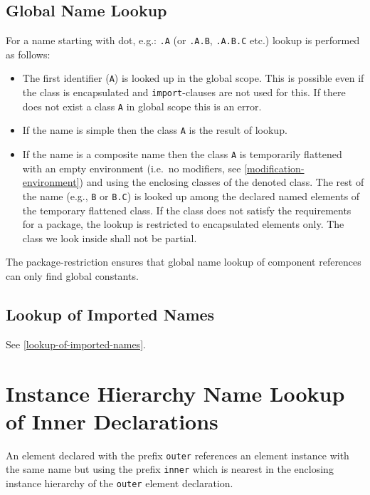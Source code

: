 \subsection{Global Name Lookup}\label{global-name-lookup}

For a name starting with dot, e.g.: \lstinline!.A! (or \lstinline!.A.B!, \lstinline!.A.B.C! etc.) lookup is performed as follows:
\begin{itemize}
\item
  The first identifier (\lstinline!A!) is looked up in the global scope.
  This is possible even if the class is encapsulated and \lstinline!import!-clauses are not used for this.
  If there does not exist a class \lstinline!A! in global scope this is an error.
\item
  If the name is simple then the class \lstinline!A! is the result of lookup.
\item
  If the name is a composite name then the class \lstinline!A! is temporarily flattened with an empty environment (i.e.\ no modifiers, see \cref{modification-environment}) and using the enclosing classes of the denoted class.
  The rest of the name (e.g., \lstinline!B! or \lstinline!B.C!) is looked up among the declared named elements of the temporary flattened class.
  If the class does not satisfy the requirements for a package, the lookup is restricted to encapsulated elements only.
  The class we look inside shall not be partial.
\end{itemize}

\begin{nonnormative}
The package-restriction ensures that global name lookup of component references can only find global constants.
\end{nonnormative}


\subsection{Lookup of Imported Names}\label{lookup-of-imported-names1}

See \cref{lookup-of-imported-names}.


\section{Instance Hierarchy Name Lookup of Inner Declarations}\label{instance-hierarchy-name-lookup-of-inner-declarations}

An element declared with the prefix \lstinline!outer! references an element instance with the same name but using the prefix \lstinline!inner! which is nearest in the enclosing instance hierarchy of the \lstinline!outer! element declaration.


